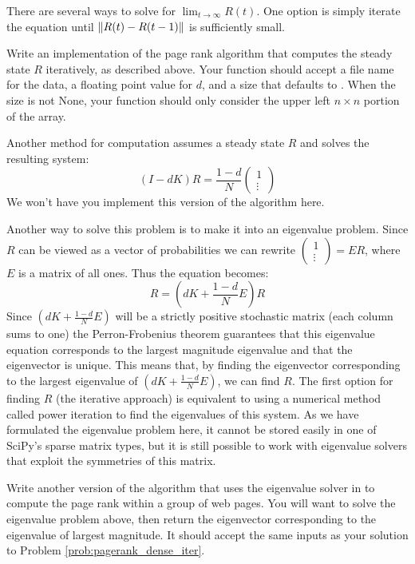 There are several ways to solve for $\lim_{t \to \infty} R(t)$.
One option is simply iterate the equation until $\left\lVert R(t)-R(t-1)\right\rVert$ is sufficiently small.

\begin{problem}
\label{prob:pagerank_dense_iter}
Write an implementation of the page rank algorithm that computes the steady state $R$ iteratively, as described above.
Your function should accept a file name for the data, a floating point value for $d$, and a size  that defaults to .
When the size is not None, your function should only consider the upper left $n \times n$ portion of the array.
\end{problem}

Another method for computation assumes a steady state $R$ and solves the resulting system:
\[(I-dK)R = \frac{1-d}{N} \begin{pmatrix}1\\\vdots\end{pmatrix}\]
We won't have you implement this version of the algorithm here.

Another way to solve this problem is to make it into an eigenvalue problem.
Since $R$ can be viewed as a vector of probabilities we can rewrite $\left(\begin{smallmatrix}1\\\vdots\end{smallmatrix}\right) = E R$, where $E$ is a matrix of all ones.
Thus the equation becomes:
\[R = (dK + \frac{1-d}{N}E)R\]
Since $(dK + \frac{1-d}{N}E)$ will be a strictly positive stochastic matrix (each column sums to one) the Perron-Frobenius theorem guarantees that this eigenvalue equation corresponds to the largest magnitude eigenvalue and that the eigenvector is unique.
This means that, by finding the eigenvector corresponding to the largest eigenvalue of $(dK + \frac{1-d}{N}E)$, we can find $R$.
The first option for finding $R$ (the iterative approach) is equivalent to using a numerical method called power iteration to find the eigenvalues of this system.
As we have formulated the eigenvalue problem here, it cannot be stored easily in one of SciPy's sparse matrix types, but it is still possible to work with eigenvalue solvers that exploit the symmetries of this matrix.

\begin{problem}
Write another version of the algorithm that uses the eigenvalue solver in  to compute the page rank within a group of web pages.
You will want to solve the eigenvalue problem above, then return the eigenvector corresponding to the eigenvalue of largest magnitude.
It should accept the same inputs as your solution to Problem \ref{prob:pagerank_dense_iter}.
\end{problem}

